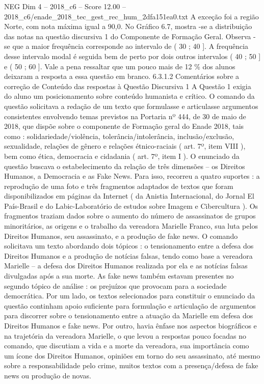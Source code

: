 \begin{textsample}{NEG Dim 4 – 2018\_c6 – Score 12.00 – 2018\_c6/enade\_2018\_tec\_gest\_rec\_hum\_2dfa151ea0.txt}
A exceção foi a região Norte, com nota máxima igual a 90,0.
No Gráfico 6.7, mostra -se a distribuição das notas na questão discursiva 1 do Componente de Formação Geral.
Observa -se que a maior frequência corresponde ao intervalo de ( 30 ; 40 ].
A frequência desse intervalo modal é seguida bem de perto por dois outros intervalos ( 40 ; 50 ] e ( 50 ; 60 ].
Vale a pena ressaltar que um pouco mais de 12 \% dos alunos deixaram a resposta a essa questão em branco. 6.3.1.2 Comentários sobre a correção de Conteúdo das respostas à Questão Discursiva 1 A Questão 1 exigia do aluno um posicionamento sobre conteúdo humanista e crítico.
O comando da questão solicitava a redação de um texto que formulasse e articulasse argumentos consistentes envolvendo temas previstos na Portaria nº 444, de 30 de maio de 2018, que dispõe sobre o componente de Formação geral do Enade 2018, tais como : solidariedade/violência, tolerância/intolerância, inclusão/exclusão, sexualidade, relações de gênero e relações étnico-raciais ( art. 7º, item VIII ), bem como ética, democracia e cidadania ( art. 7º, item I ).
O enunciado da questão buscava o estabelecimento da relação de três dimensões – os Direitos Humanos, a Democracia e as Fake News.
Para isso, recorreu a quatro suportes : a reprodução de uma foto e três fragmentos adaptados de textos que foram disponibilizados em páginas da Internet ( da Anistia Internacional, do Jornal El País-Brasil e do Labic-Laboratório de estudos sobre Imagem e Cibercultura ).
Os fragmentos traziam dados sobre o aumento do número de assassinatos de grupos minoritários, as origens e o trabalho da vereadora Marielle Franco, sua luta pelos Direitos Humanos, seu assassinato, e a produção de fake news.
O comando solicitava um texto abordando dois tópicos : o tensionamento entre a defesa dos Direitos Humanos e a produção de notícias falsas, tendo como base a vereadora Marielle – a defesa dos Direitos Humanos realizada por ela e as notícias falsas divulgadas após a sua morte.
As fake news também estavam presentes no segundo tópico de análise : os prejuízos que provocam para a sociedade democrática.
Por um lado, os textos selecionados para constituir o enunciado da questão continham apoio suficiente para formulação e articulação de argumentos para discorrer sobre o tensionamento entre a atuação da Marielle em defesa dos Direitos Humanos e fake news.
Por outro, havia ênfase nos aspectos biográficos e na trajetória da vereadora Marielle, o que levou a respostas pouco focadas no comando, que discutiam a vida e a morte da vereadora, sua importância como um ícone dos Direitos Humanos, opiniões em torno do seu assassinato, até mesmo sobre a responsabilidade pelo crime, muitos textos com a presença/defesa de fake news ou produção de novas.

\end{textsample}

